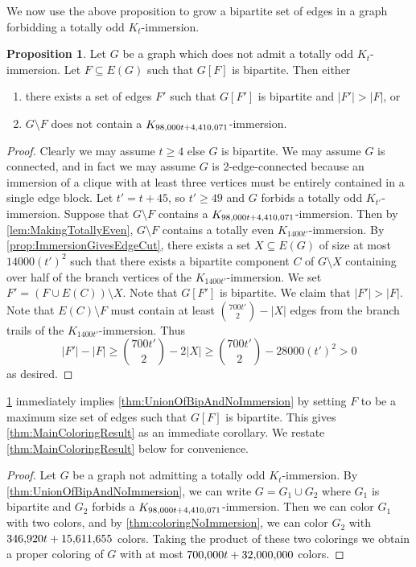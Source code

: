 \documentclass{article}
\theoremstyle{definition}
\newtheorem{proposition}[environment]{Proposition}
\begin{document}
We now use the above proposition to grow a bipartite set of edges in a graph forbidding a totally odd $K_t$-immersion.

\begin{proposition}\label{prop:GrowingBipartite}
    Let $G$ be a graph which does not admit a totally odd $K_t$-immersion. Let $F \subseteq E(G)$ such that $G[F]$ is bipartite. Then either
    \begin{enumerate}
        \item there exists a set of edges $F'$ such that $G[F']$ is bipartite and $|F'| > |F|$, or
        \item $G \setminus F$ does not contain a $K_{98{\small,}000t + 4{\small,}410{\small,}071}$-immersion.
    \end{enumerate}
\end{proposition}
\begin{proof}
    Clearly we may assume $t \geq 4$ else $G$ is bipartite. We may assume $G$ is connected, and in fact we may assume $G$ is 2-edge-connected because an immersion of a clique with at least three vertices must be entirely contained in a single edge block. Let $t' = t + 45$, so $t' \geq 49$ and $G$ forbids a totally odd $K_{t'}$-immersion. Suppose that $G \setminus F$ contains a $K_{98{\small,}000t + 4{\small,}410{\small,}071}$-immersion. Then by \cref{lem:MakingTotallyEven}, $G \setminus F$ contains a totally even $K_{1400t'}$-immersion. By \cref{prop:ImmersionGivesEdgeCut}, there exists a set $X \subseteq E(G)$ of size at most $14000(t')^2$ such that there exists a bipartite component $C$ of $G \setminus X$ containing over half of the branch vertices of the $K_{1400t'}$-immersion. We set $F' = (F \cup E(C)) \setminus X$. Note that $G[F']$ is bipartite. We claim that $|F'| > |F|$. Note that $E(C) \setminus F$ must contain at least $\binom{700t'}{2} - |X|$ edges from the branch trails of the $K_{1400t'}$-immersion. Thus
    $$|F'| - |F| \geq \binom{700t'}{2} - 2|X| \geq \binom{700t'}{2} - 28000(t')^2 > 0$$
    as desired.
\end{proof}


\cref{prop:GrowingBipartite} immediately implies \cref{thm:UnionOfBipAndNoImmersion} by setting $F$ to be a maximum size set of edges such that $G[F]$ is bipartite. This gives \cref{thm:MainColoringResult} as an immediate corollary. We restate \cref{thm:MainColoringResult} below for convenience.
\MainColoringTheorem*
\begin{proof}%
    Let $G$ be a graph not admitting a totally odd $K_t$-immersion. By \cref{thm:UnionOfBipAndNoImmersion}, we can write $G = G_1 \cup G_2$ where $G_1$ is bipartite and $G_2$ forbids a $K_{98{\small,}000t + 4{\small,}410{\small,}071}$-immersion. Then we can color $G_1$ with two colors, and by \cref{thm:coloringNoImmersion}, we can color $G_2$ with $346{\small,}920t + 15{\small,}611{\small,}655$ colors. Taking the product of these two colorings we obtain a proper coloring of $G$ with at most $700{\small,}000t + 32{\small,}000{\small,}000$ colors.
\end{proof}
\end{document}
